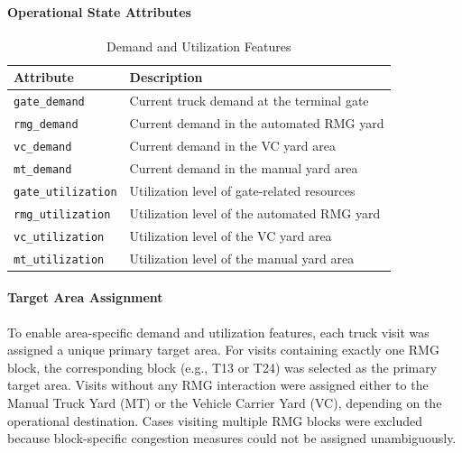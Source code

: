   \paragraph{Operational State Attributes} 
   \begin{table}[h] 
   \centering 
   \caption{Demand and Utilization Features} 
   \begin{tabular}{p{4cm} p{9cm}} 
   \hline \textbf{Attribute} & \textbf{Description} \\ \hline \texttt{gate\_demand} & Current truck demand at the terminal gate \\ \texttt{rmg\_demand} & Current demand in the automated RMG yard \\ \texttt{vc\_demand} & Current demand in the VC yard area \\ \texttt{mt\_demand} & Current demand in the manual yard area \\ \texttt{gate\_utilization} & Utilization level of gate-related resources \\ \texttt{rmg\_utilization} & Utilization level of the automated RMG yard \\ \texttt{vc\_utilization} & Utilization level of the VC yard area \\ \texttt{mt\_utilization} & Utilization level of the manual yard area \\ \hline 
   \end{tabular} \end{table}
   
   \paragraph{Target Area Assignment} To enable area-specific demand and utilization features, each truck visit was assigned a unique primary target area. For visits containing exactly one RMG block, the corresponding block (e.g., T13 or T24) was selected as the primary target area. Visits without any RMG interaction were assigned either to the Manual Truck Yard (MT) or the Vehicle Carrier Yard (VC), depending on the operational destination. Cases visiting multiple RMG blocks were excluded because block-specific congestion measures could not be assigned unambiguously.
   
